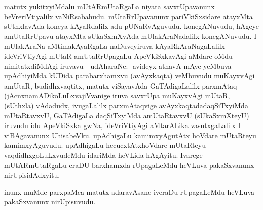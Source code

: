 \begin{artha}
matutx yukitxyiMdalu mUtARmUtaRgaLa niyata savxrUpavanunx
 beVreriVtiyalilx vaNiRsabahudu. mUtaRrUpavanunx pariVkiSxsidare
atayxMta sUthxlavAda koneya kAyaRdalilx adu
pUNaRvAguvudu. konegANuvudu, hAgeye amUtaRrUpavu atayxMta sUkaSxmXvAda
mUlakAraNadalilx konegANuvudu. I mUlakAraNa aMtimakAyaRgaLa
naDuveyiruva kAyaRkAraNagaLalilx ideVriVtiyAgi mUtaR amUtaRrUpagaLu
ApeVkiSxkavAgi aMdare oMdu nimitatxdiMdAgi iruvavu - udAharaNe:-
avideyx athavA mAye yeMbuva upAdhiyiMda kUDida parabarxhamxvu
(avAyxkaqta) veMbuvudu muKayxvAgi amUtaR, budidhxvaqtitx, matutx
viSayavAda GaTAdigaLalilx parxmAtaq (jAcnxnamADikoLuLxvajiVvanige iruva
savxrUpa muKayxvAgi mUtaR, (sUthxla) vAdadudx, ivugaLalilx
parxmAtaqvige avAyxkaqtadadaqSiTxyiMda mUtaRtavxvU, GaTAdigaLa
daqSiTxyiMda amUtaRtavxvU (sUkaSxmXteyU) iruvudu idu ApeVkiSxka gwNa,
ideVriVtiyAgi aMtarALika vasutxgaLalilx I viBAgavanunx
UhisabeVku. upAdhigaLu kamimxyAgutAtx hoVdare mUtaRteyu
kamimxyAguvudu. upAdhigaLu hecucxtAtxhoVdare mUtaRteyu
vaqdidhxgoLuLxvudeMdu idariMda heVLida hAgAyitu. Ivarege
mUtARmUtaRgaLu eraDU barxhamxda rUpagaLeMdu heVLuva pakaSxvanunx
nirUpisidAdxyitu.
\end{artha}

\begin{artha}
inunx muMde parxpaMca matutx adaravAsane iveraDu rUpagaLeMdu heVLuva
pakaSxvanunx nirUpisuvudu.
\end{artha}

\centerline{}

